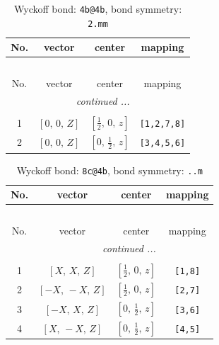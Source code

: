 \documentclass[fleqn,8pt]{jsarticle}
\begin{document}
\renewcommand{\arraystretch}{1.2}
\begin{longtable}{cccc}
\caption{Wyckoff bond: {\tt 4b@4b}, bond symmetry: {\tt 2.mm}}
 \\
 \hline \hline
No. & vector & center & mapping \\ \hline \endfirsthead

\multicolumn{3}{l}{\tablename\ \thetable{}} \\
 \hline \hline
No. & vector & center & mapping \\ \hline \endhead

 \hline \hline
\multicolumn{3}{r}{\footnotesize\it continued ...} \\ \endfoot

 \hline \hline
\multicolumn{3}{r}{} \\ \endlastfoot

1 & $\left[ 0,\, 0,\, Z \right]$ & $\left[ \frac{1}{2},\, 0,\, z \right]$ & {\tt [1,2,7,8]} \\ \hline
2 & $\left[ 0,\, 0,\, Z \right]$ & $\left[ 0,\, \frac{1}{2},\, z \right]$ & {\tt [3,4,5,6]} \\
\end{longtable}
\renewcommand{\arraystretch}{1.2}
\begin{longtable}{cccc}
\caption{Wyckoff bond: {\tt 8c@4b}, bond symmetry: {\tt ..m}}
 \\
 \hline \hline
No. & vector & center & mapping \\ \hline \endfirsthead

\multicolumn{3}{l}{\tablename\ \thetable{}} \\
 \hline \hline
No. & vector & center & mapping \\ \hline \endhead

 \hline \hline
\multicolumn{3}{r}{\footnotesize\it continued ...} \\ \endfoot

 \hline \hline
\multicolumn{3}{r}{} \\ \endlastfoot

1 & $\left[ X,\, X,\, Z \right]$ & $\left[ \frac{1}{2},\, 0,\, z \right]$ & {\tt [1,8]} \\ \hline
2 & $\left[ - X,\, - X,\, Z \right]$ & $\left[ \frac{1}{2},\, 0,\, z \right]$ & {\tt [2,7]} \\ \hline
3 & $\left[ - X,\, X,\, Z \right]$ & $\left[ 0,\, \frac{1}{2},\, z \right]$ & {\tt [3,6]} \\ \hline
4 & $\left[ X,\, - X,\, Z \right]$ & $\left[ 0,\, \frac{1}{2},\, z \right]$ & {\tt [4,5]} \\
\end{longtable}
\end{document}
